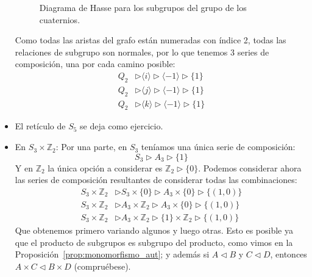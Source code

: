 \begin{ejemplo}
\begin{itemize}
\begin{figure}[H]
                \caption{Diagrama de Hasse para los subgrupos del grupo de los cuaternios.}
            \end{figure}
            Como todas las aristas del grafo están numeradas con índice 2, todas las relaciones de subgrupo son normales, por lo que tenemos 3 series de composición, una por cada camino posible:
            \begin{align*}
                Q_2 &\rhd \langle i \rangle  \rhd \langle -1 \rangle  \rhd \{1\} \\
                Q_2 &\rhd \langle j \rangle  \rhd \langle -1 \rangle  \rhd \{1\} \\
                Q_2 &\rhd \langle k \rangle  \rhd \langle -1 \rangle  \rhd \{1\} 
            \end{align*}
        \item El retículo de $S_5$ se deja como ejercicio.
        \item En $S_3\times \mathbb{Z}_2$:
            Por una parte, en $S_3$ teníamos una única serie de composición:
            \begin{equation*}
                S_3 \rhd A_3 \rhd \{1\}
            \end{equation*}
            Y en $\mathbb{Z}_2$ la única opción a considerar es $\mathbb{Z}_2 \rhd \{0\}$.
            Podemos considerar ahora las series de composición resultantes de considerar todas las combinaciones:
            \begin{align*}
                S_3\times \mathbb{Z}_2 &\rhd S_3 \times \{0\} \rhd A_3\times \{0\} \rhd \{(1,0)\} \\
                S_3\times \mathbb{Z}_2 &\rhd A_3\times \mathbb{Z}_2 \rhd A_3 \times \{0\} \rhd \{(1,0)\} \\
                S_3\times \mathbb{Z}_2 &\rhd A_3\times \mathbb{Z}_2 \rhd \{1\}\times \mathbb{Z}_2 \rhd \{(1,0)\}
            \end{align*}
            Que obtenemos primero variando algunos y luego otras. Esto es posible ya que el producto de subgrupos es subgrupo del producto, como vimos en la Proposición~\ref{prop:monomorfismo_aut}; y además si $A\lhd B$ y $C\lhd D$, entonces $A\times C \lhd B\times D$ (compruébese).


\end{itemize}
\end{ejemplo}
